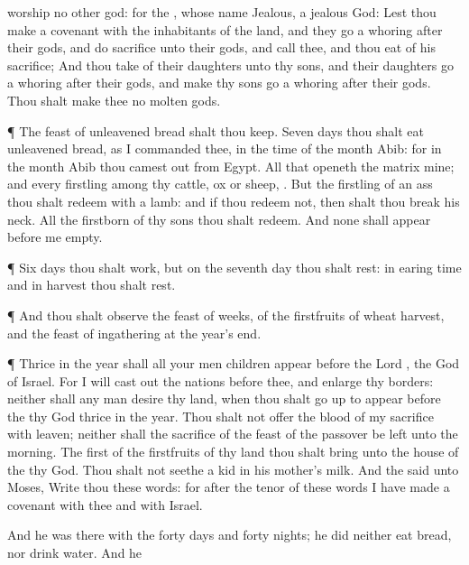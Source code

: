 {worship no
other
god: for the
{}, whose
name
{}
Jealous,
{} a
jealous
God:
Lest thou
make a
covenant with the
inhabitants of the
land, and they go a
whoring
after their
gods, and do
sacrifice unto their
gods, and
{}
call thee, and thou
eat of his
sacrifice;
And thou
take of their
daughters unto thy
sons, and their
daughters go a
whoring
after their
gods, and
make thy
sons go a
whoring
after their
gods.
Thou shalt
make thee no
molten
gods.
\par }{\PP {}¶ The
feast of unleavened
bread shalt thou
keep.
Seven
days thou shalt
eat unleavened
bread, as I
commanded thee, in the
time of the
month
Abib: for in the
month
Abib thou camest
out from
Egypt.
All that
openeth the
matrix
{} mine; and every
firstling among thy
cattle,
{}
ox or
sheep,
{}.
But the
firstling of an
ass thou shalt
redeem with a
lamb: and if thou
redeem
{} not, then shalt thou break his
neck. All the
firstborn of thy
sons thou shalt
redeem. And none shall
appear
before me
empty.
\par }{\PP {}¶
Six
days thou shalt
work, but on the
seventh
day thou shalt
rest: in earing
time and in
harvest thou shalt
rest.
\par }{\PP {}¶ And thou shalt
observe the
feast of
weeks, of the
firstfruits of
wheat
harvest, and the
feast of
ingathering at the
year’s
end.
\par }{\PP {}¶
Thrice in the
year shall all your men
children
appear
before the
Lord
{}, the
God of
Israel.
For I will cast
out the
nations
before thee, and
enlarge thy
borders: neither shall any
man
desire thy
land, when thou shalt go
up to
appear
before the
{} thy
God
thrice in the
year.
Thou shalt not
offer the
blood of my
sacrifice with
leaven; neither shall the
sacrifice of the
feast of the
passover be
left unto the
morning.
The
first of the
firstfruits of thy
land thou shalt
bring unto the
house of the
{} thy
God. Thou shalt not
seethe a
kid in his
mother’s
milk.
And the
{}
said unto
Moses,
Write thou these
words: for after the
tenor of these
words I have
made a
covenant with thee and with
Israel.
\par }{\PP {}And he was there with the
{}
forty
days and
forty
nights; he did neither
eat
bread, nor
drink
water. And he
}
